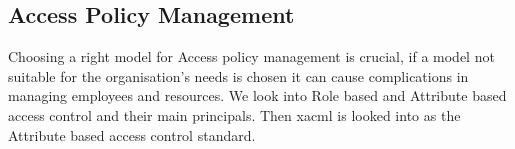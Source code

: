 \subsection{Access Policy Management} \label{APM_sota}
Choosing a right model for Access policy management is crucial, if a model not suitable for the organisation's needs is chosen it can cause complications in managing employees and resources. We look into Role based and Attribute based access control and their main principals. Then \acrshort{xacml} is looked into as the Attribute based access control standard.


